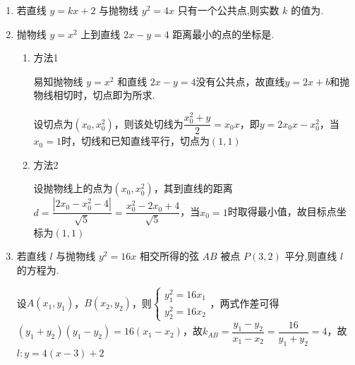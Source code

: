 \begin{enumerate}
    \item 若直线 $y = {kx} + 2$ 与抛物线 ${y}^{2} = {4x}$ 只有一个公共点,则实数 $k$ 的值为.
    \begin{jieda}
    \end{jieda}


    \item 抛物线 $y = {x}^{2}$ 上到直线 ${2x} - y = 4$ 距离最小的点的坐标是.
    \begin{jieda}
        \begin{enumerate}
            \item 方法1

            易知抛物线 $y = {x}^{2}$ 和直线 ${2x} - y = 4$没有公共点，故直线$y = 2x+b$和抛物线相切时，切点即为所求.

            设切点为$(x_0, x_0^2)$，则该处切线为$\dfrac{x_0^2+y}{2} = x_0x$，即$y = 2x_0x-x_0^2$，当$x_0 = 1$时，切线和已知直线平行，切点为$(1, 1)$

            \item 方法2

            设抛物线上的点为$(x_0, x_0^2)$，其到直线的距离$d = \dfrac{|2x_0-x_0^2-4|}{\sqrt{5}} = \dfrac{x_0^2-2x_0+4}{\sqrt{5}}$，当$x_0 = 1$时取得最小值，故目标点坐标为$(1,1)$
        \end{enumerate}
    \end{jieda}


    \item 若直线 $l$ 与抛物线 ${y}^{2} = {16x}$ 相交所得的弦 ${AB}$ 被点 $P\left( {3,2}\right)$ 平分,则直线 $l$ 的方程为.
    \begin{jieda}
        设$A(x_1, y_1)$，$B(x_2, y_2)$，则$\left\{\begin{array}{l}
             y_1^2 = 16x_1  \\
             y_2^2 = 16x_2 
        \end{array}\right.$，两式作差可得$(y_1+y_2)(y_1-y_2) = 16(x_1-x_2)$，故$k_{AB} = \dfrac{y_1-y_2}{x_1-x_2} = \dfrac{16}{y_1+y_2} = 4$，故$l: y = 4(x-3)+2$
    \end{jieda}



\end{enumerate}
